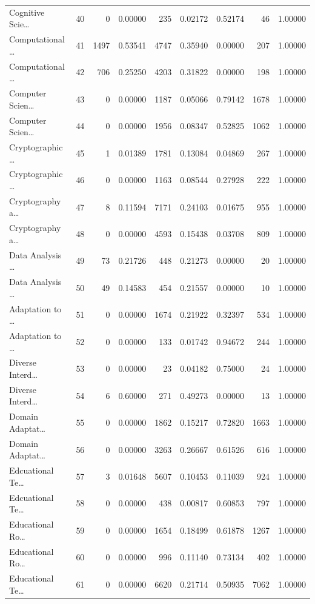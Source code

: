 \begin{table}
\begin{tabular}{lrrrrrrrr}
Cognitive Scie… & 40 & 0 & 0.00000 & 235 & 0.02172 & 0.52174 & 46 & 1.00000 \\
Computational … & 41 & 1497 & 0.53541 & 4747 & 0.35940 & 0.00000 & 207 & 1.00000 \\
Computational … & 42 & 706 & 0.25250 & 4203 & 0.31822 & 0.00000 & 198 & 1.00000 \\
Computer Scien… & 43 & 0 & 0.00000 & 1187 & 0.05066 & 0.79142 & 1678 & 1.00000 \\
Computer Scien… & 44 & 0 & 0.00000 & 1956 & 0.08347 & 0.52825 & 1062 & 1.00000 \\
Cryptographic … & 45 & 1 & 0.01389 & 1781 & 0.13084 & 0.04869 & 267 & 1.00000 \\
Cryptographic … & 46 & 0 & 0.00000 & 1163 & 0.08544 & 0.27928 & 222 & 1.00000 \\
Cryptography a… & 47 & 8 & 0.11594 & 7171 & 0.24103 & 0.01675 & 955 & 1.00000 \\
Cryptography a… & 48 & 0 & 0.00000 & 4593 & 0.15438 & 0.03708 & 809 & 1.00000 \\
Data Analysis … & 49 & 73 & 0.21726 & 448 & 0.21273 & 0.00000 & 20 & 1.00000 \\
Data Analysis … & 50 & 49 & 0.14583 & 454 & 0.21557 & 0.00000 & 10 & 1.00000 \\
Adaptation to … & 51 & 0 & 0.00000 & 1674 & 0.21922 & 0.32397 & 534 & 1.00000 \\
Adaptation to … & 52 & 0 & 0.00000 & 133 & 0.01742 & 0.94672 & 244 & 1.00000 \\
Diverse Interd… & 53 & 0 & 0.00000 & 23 & 0.04182 & 0.75000 & 24 & 1.00000 \\
Diverse Interd… & 54 & 6 & 0.60000 & 271 & 0.49273 & 0.00000 & 13 & 1.00000 \\
Domain Adaptat… & 55 & 0 & 0.00000 & 1862 & 0.15217 & 0.72820 & 1663 & 1.00000 \\
Domain Adaptat… & 56 & 0 & 0.00000 & 3263 & 0.26667 & 0.61526 & 616 & 1.00000 \\
Edcuational Te… & 57 & 3 & 0.01648 & 5607 & 0.10453 & 0.11039 & 924 & 1.00000 \\
Edcuational Te… & 58 & 0 & 0.00000 & 438 & 0.00817 & 0.60853 & 797 & 1.00000 \\
Educational Ro… & 59 & 0 & 0.00000 & 1654 & 0.18499 & 0.61878 & 1267 & 1.00000 \\
Educational Ro… & 60 & 0 & 0.00000 & 996 & 0.11140 & 0.73134 & 402 & 1.00000 \\
Educational Te… & 61 & 0 & 0.00000 & 6620 & 0.21714 & 0.50935 & 7062 & 1.00000 \\

\end{tabular}
\end{table}
